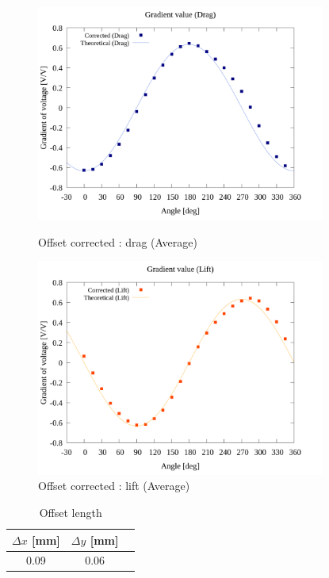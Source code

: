 \begin{figure}[htbp]
		\centering
		\includegraphics[width=95mm]{../../02_workspace/result/2-ex/plot/21/21-2_corrected_offset_drag.png}
		\caption{Offset corrected : drag (Average)}
		\includegraphics[width=95mm]{../../02_workspace/result/2-ex/plot/21/21-2_corrected_offset_lift.png}
		\caption{Offset corrected : lift (Average)}
\end{figure}

\begin{table}[htbp]
  \begin{center}
      \caption{Offset length}
      \begin{tabular}{|p{30mm}|p{20mm}|p{20mm}|}
          \hline
          \multicolumn{1}{|c|}{$\Delta x$ [mm]} & \multicolumn{1}{|c|}{$\Delta y$ [mm]} \\ \hline
          \multicolumn{1}{|c|}{0.09}           & \multicolumn{1}{|c|}{0.06}           \\ \hline
      \end{tabular}
  \end{center}
\end{table}

\newpage

